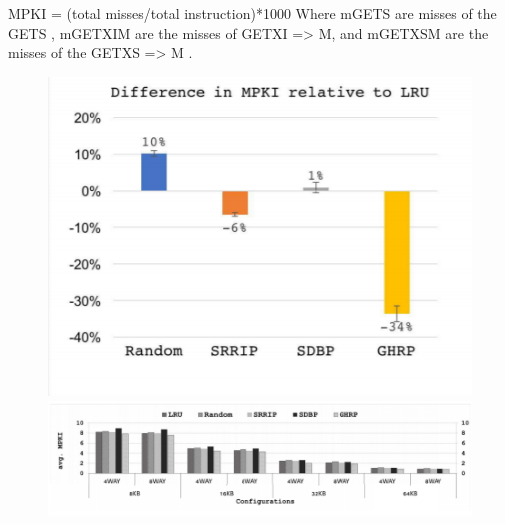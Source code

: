 \documentclass[11pt]{article}
\begin{document}
MPKI = (total misses/total instruction)*1000
Where mGETS are misses of the GETS , mGETXIM are the
misses of GETXI => M, and mGETXSM are the misses
of the GETXS => M .

\begin{figure}[h]
	\includegraphics[width=1\textwidth]{report1.PNG}
	\includegraphics[width=1\textwidth]{reportresult.PNG}
\end{figure}
\end{document}
